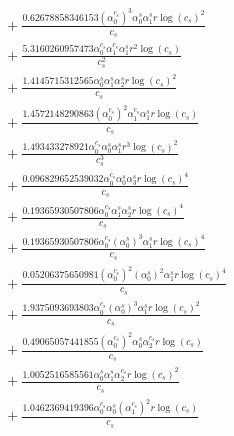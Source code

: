 \documentclass[10pt]{article}
\begin{document}
\begin{align*}
&{}  + \frac{0.62678858346153 \left(\alpha_{0}^{c_s}\right)^{3} \alpha_{0}^s \alpha_{1}^s r \log{\left(c_{s} \right)}^{2}}{c_{s}} \\
&{}  + \frac{5.3160260957473 \alpha_{0}^{c_s} \alpha_{1}^{c_s} \alpha_{1}^s r^{2} \log{\left(c_{s} \right)}}{c_{s}^{2}} \\
&{}  + \frac{1.4145715312565 \alpha_{0}^s \alpha_{1}^s \alpha_{2}^s r \log{\left(c_{s} \right)}^{2}}{c_{s}} \\
&{}  + \frac{1.4572148290863 \left(\alpha_{0}^{c_s}\right)^{2} \alpha_{1}^{c_s} \alpha_{1}^s r \log{\left(c_{s} \right)}}{c_{s}} \\
&{}  + \frac{1.493433278921 \alpha_{0}^{c_s} \alpha_{0}^s \alpha_{1}^s r^{3} \log{\left(c_{s} \right)}^{2}}{c_{s}^{3}} \\
&{}  + \frac{0.096829652539032 \alpha_{0}^{c_s} \alpha_{0}^s \alpha_{3}^s r \log{\left(c_{s} \right)}^{4}}{c_{s}} \\
&{}  + \frac{0.19365930507806 \alpha_{0}^{c_s} \alpha_{1}^s \alpha_{2}^s r \log{\left(c_{s} \right)}^{4}}{c_{s}} \\
&{}  + \frac{0.19365930507806 \alpha_{0}^{c_s} \left(\alpha_{0}^s\right)^{3} \alpha_{1}^s r \log{\left(c_{s} \right)}^{4}}{c_{s}} \\
&{}  + \frac{0.05206375650981 \left(\alpha_{0}^{c_s}\right)^{2} \left(\alpha_{0}^s\right)^{2} \alpha_{1}^s r \log{\left(c_{s} \right)}^{4}}{c_{s}} \\
&{}  + \frac{1.9375093693803 \alpha_{0}^{c_s} \left(\alpha_{0}^s\right)^{3} \alpha_{1}^s r \log{\left(c_{s} \right)}^{2}}{c_{s}} \\
&{}  + \frac{0.49065057441855 \left(\alpha_{0}^{c_s}\right)^{2} \alpha_{0}^s \alpha_{2}^{c_s} r \log{\left(c_{s} \right)}}{c_{s}} \\
&{}  + \frac{1.0052516585561 \alpha_{0}^s \alpha_{1}^s \alpha_{2}^{c_s} r \log{\left(c_{s} \right)}^{2}}{c_{s}} \\
&{}  + \frac{1.0462369419396 \alpha_{0}^{c_s} \alpha_{0}^s \left(\alpha_{1}^{c_s}\right)^{2} r \log{\left(c_{s} \right)}}{c_{s}}
\end{align*}
\end{document}
